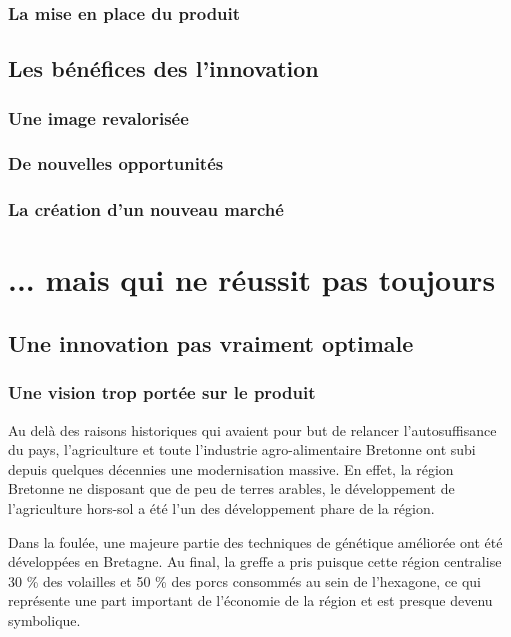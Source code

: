 \documentclass[a4paper,10pt]{report}
\begin{document}
		\subsection{La mise en place du produit}
			
	\section{Les bénéfices des l'innovation}
		
		\subsection{Une image revalorisée}
				
		\subsection{De nouvelles opportunités}
				
		\subsection{La création d'un nouveau marché}

\chapter{... mais qui ne réussit pas toujours}

	\section{Une innovation pas vraiment optimale}
	
		\subsection{Une vision trop portée sur le produit}
			Au delà des raisons historiques qui avaient pour but de relancer l’autosuffisance du pays, l’agriculture et toute l’industrie agro-alimentaire Bretonne ont subi depuis quelques décennies une modernisation massive. En effet, la région Bretonne ne disposant que de peu de terres arables, le développement de l’agriculture hors-sol a été l’un des développement phare de la région. 
			
			Dans la foulée, une majeure partie des techniques de génétique améliorée ont été développées en Bretagne. Au final, la greffe a pris puisque cette région centralise 30 \% des volailles et 50 \% des porcs consommés au sein de l’hexagone, ce qui représente une part important de l’économie de la région et est presque devenu symbolique.
			
\end{document}
